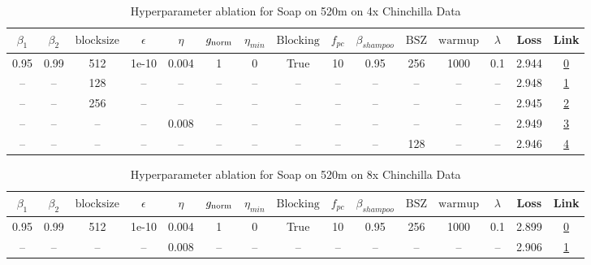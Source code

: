 \begin{table}[H]
\centering
\caption{Hyperparameter ablation for Soap on 520m on 4x Chinchilla Data}
\label{tab:ablation_soap_520m_on_4x_chinchilla_data}
\begin{tabular}{ccccccccccccccc}
\toprule
$\beta_1$ & $\beta_2$ & $\mathrm{block size}$ & $\epsilon$ & $\eta$ & $g_{\mathrm{norm}}$ & $\eta_{min}$ & $\mathrm{Blocking}$ & $f_{pc}$ & $\beta_{shampoo}$ & $\mathrm{BSZ}$ & $\mathrm{warmup}$ & $\lambda$ & Loss & Link \\
\midrule
0.95 & 0.99 & 512 & 1e-10 & 0.004 & 1 & 0 & True & 10 & 0.95 & 256 & 1000 & 0.1 & 2.944 & \href{https://wandb.ai/marin-community/optimizer-scaling/runs/sweep-520m-42B-soapepde58c5lr0.004-wd0.1-minlr0-warmup1000-b10.9-c834a4}{0} \\
\midrule
-- & -- & 128 & -- & -- & -- & -- & -- & -- & -- & -- & -- & -- & 2.948 & \href{https://wandb.ai/marin-community/optimizer-scaling/runs/sweep-520m-42B-soapedb348f5lr0.004-wd0.1-minlr0-warmup1000-b10.9-b0ebf2}{1} \\
-- & -- & 256 & -- & -- & -- & -- & -- & -- & -- & -- & -- & -- & 2.945 & \href{https://wandb.ai/marin-community/optimizer-scaling/runs/sweep-520m-42B-soaped5aacdclr0.004-wd0.1-minlr0-warmup1000-b10.9-94f724}{2} \\
-- & -- & -- & -- & 0.008 & -- & -- & -- & -- & -- & -- & -- & -- & 2.949 & \href{https://wandb.ai/marin-community/optimizer-scaling/runs/sweep-520m-42B-soapepef50b6lr0.008-wd0.1-minlr0-warmup1000-b10.9-0c8c99}{3} \\
-- & -- & -- & -- & -- & -- & -- & -- & -- & -- & 128 & -- & -- & 2.946 & \href{https://wandb.ai/marin-community/optimizer-scaling/runs/sweep-520m-42B-soapepa7a19flr0.004-wd0.1-minlr0-warmup1000-b10.9-868eca}{4} \\
\bottomrule
\end{tabular}
\end{table}

\begin{table}[H]
\centering
\caption{Hyperparameter ablation for Soap on 520m on 8x Chinchilla Data}
\label{tab:ablation_soap_520m_on_8x_chinchilla_data}
\begin{tabular}{ccccccccccccccc}
\toprule
$\beta_1$ & $\beta_2$ & $\mathrm{block size}$ & $\epsilon$ & $\eta$ & $g_{\mathrm{norm}}$ & $\eta_{min}$ & $\mathrm{Blocking}$ & $f_{pc}$ & $\beta_{shampoo}$ & $\mathrm{BSZ}$ & $\mathrm{warmup}$ & $\lambda$ & Loss & Link \\
\midrule
0.95 & 0.99 & 512 & 1e-10 & 0.004 & 1 & 0 & True & 10 & 0.95 & 256 & 1000 & 0.1 & 2.899 & \href{https://wandb.ai/marin-community/optimizer-scaling/runs/sweep-520m-85B-soapeaa7a19flr0.004-wd0.1-minlr0-warmup1000-b10.9-fe941f}{0} \\
\midrule
-- & -- & -- & -- & 0.008 & -- & -- & -- & -- & -- & -- & -- & -- & 2.906 & \href{https://wandb.ai/marin-community/optimizer-scaling/runs/sweep-520m-85B-soapew298532lr0.008-wd0.1-minlr0-warmup1000-b10.9-59eeb6}{1} \\
\bottomrule
\end{tabular}
\end{table}

